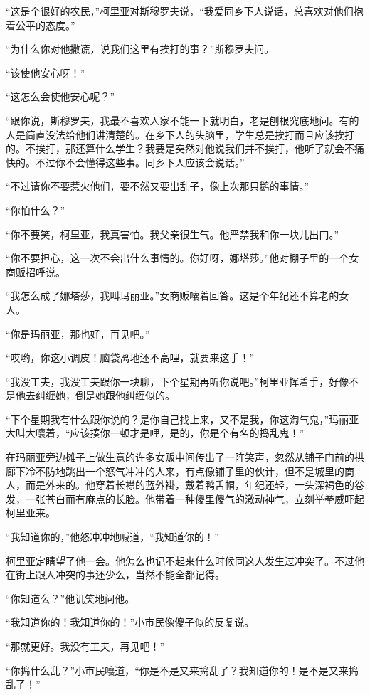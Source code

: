 \par “这是个很好的农民，”柯里亚对斯穆罗夫说，“我爱同乡下人说话，总喜欢对他们抱着公平的态度。”
\par “为什么你对他撒谎，说我们这里有挨打的事？”斯穆罗夫问。
\par “该使他安心呀！”
\par “这怎么会使他安心呢？”
\par “跟你说，斯穆罗夫，我最不喜欢人家不能一下就明白，老是刨根究底地问。有的人是简直没法给他们讲清楚的。在乡下人的头脑里，学生总是挨打而且应该挨打的。不挨打，那还算什么学生？我要是突然对他说我们并不挨打，他听了就会不痛快的。不过你不会懂得这些事。同乡下人应该会说话。”
\par “不过请你不要惹火他们，要不然又要出乱子，像上次那只鹅的事情。”
\par “你怕什么？”
\par “你不要笑，柯里亚，我真害怕。我父亲很生气。他严禁我和你一块儿出门。”
\par “你不要担心，这一次不会出什么事情的。你好呀，娜塔莎。”他对棚子里的一个女商贩招呼说。
\par “我怎么成了娜塔莎，我叫玛丽亚。”女商贩嚷着回答。这是个年纪还不算老的女人。
\par “你是玛丽亚，那也好，再见吧。”
\par “哎哟，你这小调皮！脑袋离地还不高哩，就要来这手！”
\par “我没工夫，我没工夫跟你一块聊，下个星期再听你说吧。”柯里亚挥着手，好像不是他去纠缠她，倒是她跟他纠缠似的。
\par “下个星期我有什么跟你说的？是你自己找上来，又不是我，你这淘气鬼，”玛丽亚大叫大嚷着，“应该揍你一顿才是哩，是的，你是个有名的捣乱鬼！”
\par 在玛丽亚旁边摊子上做生意的许多女贩中间传出了一阵笑声，忽然从铺子门前的拱廊下冷不防地跳出一个怒气冲冲的人来，有点像铺子里的伙计，但不是城里的商人，而是外来的。他穿着长襟的蓝外褂，戴着鸭舌帽，年纪还轻，一头深褐色的卷发，一张苍白而有麻点的长脸。他带着一种傻里傻气的激动神气，立刻举拳威吓起柯里亚来。
\par “我知道你的，”他怒冲冲地喊道，“我知道你的！”
\par 柯里亚定睛望了他一会。他怎么也记不起来什么时候同这人发生过冲突了。不过他在街上跟人冲突的事还少么，当然不能全都记得。
\par “你知道么？”他讥笑地问他。
\par “我知道你的！我知道你的！”小市民像傻子似的反复说。
\par “那就更好。我没有工夫，再见吧！”
\par “你捣什么乱？”小市民嚷道，“你是不是又来捣乱了？我知道你的！是不是又来捣乱了！”
